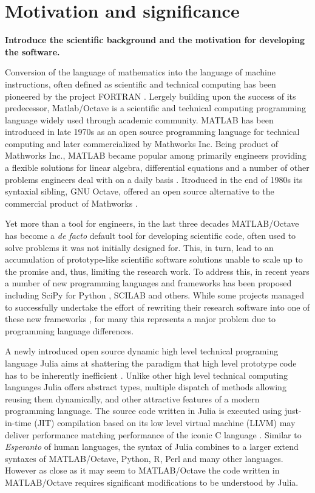 \section{Motivation and significance}
\label{} 

\textbf{Introduce the scientific background and the motivation for developing the software.}

Conversion of the language of mathematics into the language of machine instructions, often defined as scientific and technical computing has been pioneered by the project FORTRAN \cite{Backus:1957:FAC}. Lergely building upon the success of its predecessor, Matlab/Octave is a scientific and technical computing programming language widely used through academic community. MATLAB has been introduced in late 1970s as an open source programming language for technical computing and later commercialized by Mathworks Inc. Being product of Mathworks Inc., MATLAB became popular among primarily engineers providing a flexible solutions for linear algebra, differential equations and a number of other problems engineers deal with on a daily basis \cite{moore2014matlab}. Itroduced in the end of 1980s its syntaxial sibling, GNU Octave, offered an open source alternative to the commercial product of Mathworks \cite{eaton1997gnu}.

Yet more than a tool for engineers, in the last three decades MATLAB/Octave has become a \textit{de facto} default tool for developing scientific code, often used to solve problems it was not initially designed for. This, in turn, lead to an accumulation of prototype-like scientific software solutions unable to scale up to the promise and, thus, limiting the research work. To address this, in recent years a number of new programming languages and frameworks has been proposed including SciPy for Python \cite{jones2001open, Olivier_2002}, SCILAB \cite{Campbell_2009} and others. While some projects managed to successfully undertake the effort of rewriting their research software into one of these new frameworks \cite{17076895, 21349861}, for many this represents a major problem due to programming language differences.

A newly introduced open source dynamic high level technical programing language Julia aims at shattering the paradigm that high level prototype code has to be inherently inefficient \cite{bezanson2012julia, bezanson2014julia}.  Unlike other high level technical computing languages Julia offers abstract types, multiple dispatch of methods allowing reusing them dynamically, and other attractive features of a modern programming language. The source code written in Julia is executed using just-in-time (JIT) compilation based on its low level virtual machine (LLVM) may deliver performance matching performance of the iconic C language \cite{bezanson2012julia, bezanson2014julia}. Similar to \textit{Esperanto} of human languages, the syntax of Julia combines to a larger extend syntaxes of MATLAB/Octave, Python, R, Perl and many other languages. However as close as it may seem to MATLAB/Octave the code written in MATLAB/Octave requires significant modifications to be understood by Julia.


